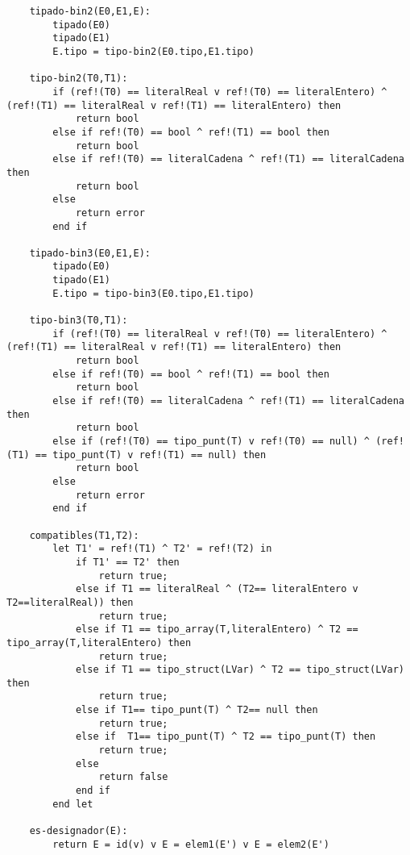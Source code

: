 \begin{lstlisting}
    tipado-bin2(E0,E1,E):
        tipado(E0)
        tipado(E1)
        E.tipo = tipo-bin2(E0.tipo,E1.tipo)

    tipo-bin2(T0,T1):
        if (ref!(T0) == literalReal v ref!(T0) == literalEntero) ^ (ref!(T1) == literalReal v ref!(T1) == literalEntero) then
            return bool
        else if ref!(T0) == bool ^ ref!(T1) == bool then
            return bool
        else if ref!(T0) == literalCadena ^ ref!(T1) == literalCadena then 
            return bool
        else
            return error
        end if

    tipado-bin3(E0,E1,E):
        tipado(E0)
        tipado(E1)
        E.tipo = tipo-bin3(E0.tipo,E1.tipo)

    tipo-bin3(T0,T1):
        if (ref!(T0) == literalReal v ref!(T0) == literalEntero) ^ (ref!(T1) == literalReal v ref!(T1) == literalEntero) then
            return bool
        else if ref!(T0) == bool ^ ref!(T1) == bool then
            return bool
        else if ref!(T0) == literalCadena ^ ref!(T1) == literalCadena then 
            return bool
        else if (ref!(T0) == tipo_punt(T) v ref!(T0) == null) ^ (ref!(T1) == tipo_punt(T) v ref!(T1) == null) then
            return bool
        else
            return error
        end if

    compatibles(T1,T2):
        let T1' = ref!(T1) ^ T2' = ref!(T2) in
            if T1' == T2' then
                return true;
            else if T1 == literalReal ^ (T2== literalEntero v T2==literalReal)) then
            	return true;
            else if T1 == tipo_array(T,literalEntero) ^ T2 == tipo_array(T,literalEntero) then
            	return true;
            else if T1 == tipo_struct(LVar) ^ T2 == tipo_struct(LVar) then
            	return true;
            else if T1== tipo_punt(T) ^ T2== null then
            	return true;
            else if  T1== tipo_punt(T) ^ T2 == tipo_punt(T) then
            	return true;
            else
                return false
            end if
        end let

    es-designador(E):
        return E = id(v) v E = elem1(E') v E = elem2(E')

\end{lstlisting}
